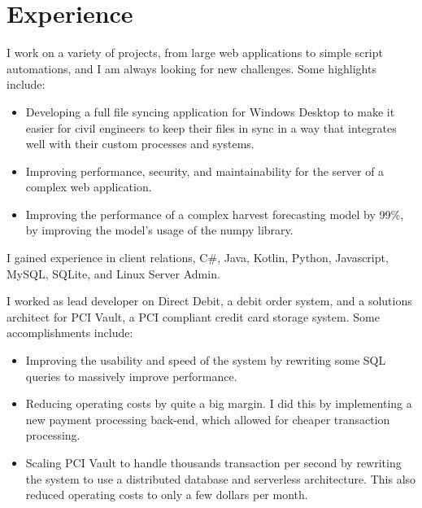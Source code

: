 \documentclass[a4paper]{twentysecondcv} %
\begin{document}

\section{Experience}

\begin{twenty} %
    {I work on a variety of projects, from large web applications to simple script automations, and I am always looking for new challenges. Some highlights include:
    \begin{itemize}
        \item Developing a full file syncing application for Windows Desktop to make it easier for civil engineers to keep their files in sync in a way that integrates well with their custom processes and systems.
        \item Improving performance, security, and maintainability for the server of a complex web application.
        \item Improving the performance of a complex harvest forecasting model by 99\%, by improving the model's usage of the numpy library.
    \end{itemize}
    I gained experience in client relations, C\#, Java, Kotlin, Python, Javascript, MySQL, SQLite, and Linux Server Admin.}
        {I worked as lead developer on Direct Debit, a debit order system, and a solutions architect for PCI Vault, a PCI compliant credit card storage system.
        Some accomplishments include:
        \begin{itemize}
            \item Improving the usability and speed of the system by rewriting some SQL queries to massively improve performance.
            \item Reducing operating costs by quite a big margin. I did this by implementing a new payment processing back-end, which allowed for cheaper transaction processing.
            \item Scaling PCI Vault to handle thousands transaction per second by rewriting the system to use a distributed database and serverless architecture. This also reduced operating costs to only a few dollars per month.

\end{itemize}}
\end{twenty}
\end{document}
